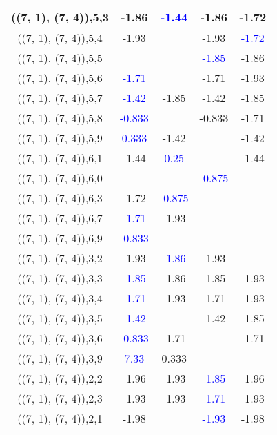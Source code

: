 \documentclass{article}
\begin{document}
\begin{center}
\begin{longtable}{|c|c|c|c|c|}
        	\hline
        	((7, 1), (7, 4)),5,3&-1.86& \textcolor{blue}{-1.44}&-1.86&-1.72\\
        	\hline
        	((7, 1), (7, 4)),5,4&-1.93&&-1.93& \textcolor{blue}{-1.72}\\
        	\hline
        	((7, 1), (7, 4)),5,5&&& \textcolor{blue}{-1.85}&-1.86\\
        	\hline
        	((7, 1), (7, 4)),5,6& \textcolor{blue}{-1.71}&&-1.71&-1.93\\
        	\hline
        	((7, 1), (7, 4)),5,7& \textcolor{blue}{-1.42}&-1.85&-1.42&-1.85\\
        	\hline
        	((7, 1), (7, 4)),5,8& \textcolor{blue}{-0.833}&&-0.833&-1.71\\
        	\hline
        	((7, 1), (7, 4)),5,9& \textcolor{blue}{0.333}&-1.42&&-1.42\\
        	\hline
        	((7, 1), (7, 4)),6,1&-1.44& \textcolor{blue}{0.25}&&-1.44\\
        	\hline
        	((7, 1), (7, 4)),6,0&&& \textcolor{blue}{-0.875}&\\
        	\hline
        	((7, 1), (7, 4)),6,3&-1.72& \textcolor{blue}{-0.875}&&\\
        	\hline
        	((7, 1), (7, 4)),6,7& \textcolor{blue}{-1.71}&-1.93&&\\
        	\hline
        	((7, 1), (7, 4)),6,9& \textcolor{blue}{-0.833}&&&\\
        	\hline
        	((7, 1), (7, 4)),3,2&-1.93& \textcolor{blue}{-1.86}&-1.93&\\
        	\hline
        	((7, 1), (7, 4)),3,3& \textcolor{blue}{-1.85}&-1.86&-1.85&-1.93\\
        	\hline
        	((7, 1), (7, 4)),3,4& \textcolor{blue}{-1.71}&-1.93&-1.71&-1.93\\
        	\hline
        	((7, 1), (7, 4)),3,5& \textcolor{blue}{-1.42}&&-1.42&-1.85\\
        	\hline
        	((7, 1), (7, 4)),3,6& \textcolor{blue}{-0.833}&-1.71&&-1.71\\
        	\hline
        	((7, 1), (7, 4)),3,9& \textcolor{blue}{7.33}&0.333&&\\
        	\hline
        	((7, 1), (7, 4)),2,2&-1.96&-1.93& \textcolor{blue}{-1.85}&-1.96\\
        	\hline
        	((7, 1), (7, 4)),2,3&-1.93&-1.93& \textcolor{blue}{-1.71}&-1.93\\
        	\hline
        	((7, 1), (7, 4)),2,1&-1.98&& \textcolor{blue}{-1.93}&-1.98\\

\end{longtable}
\end{center}
\end{document}
